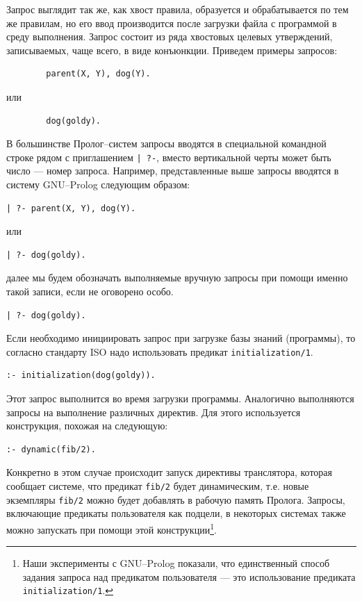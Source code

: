 \documentclass[12pt, openany, twoside]{book} %
\begin{document}
Запрос выглядит так же, как хвост правила, образуется и обрабатывается по тем же правилам, но его ввод производится после загрузки файла с программой в среду выполнения. Запрос состоит из ряда хвостовых целевых утверждений, записываемых, чаще всего, в виде конъюнкции. Приведем примеры запросов:
{\tt\begin{verbatim}
        parent(X, Y), dog(Y).
\end{verbatim}}
\noindent или
{\tt\begin{verbatim}
        dog(goldy).
\end{verbatim}}
В большинстве Пролог--систем запросы вводятся в специальной командной строке рядом с приглашением \texttt{| ?-}, вместо вертикальной черты может быть число --- номер запроса. Например, представленные выше запросы вводятся в систему GNU--Prolog следующим образом:
{\tt\begin{verbatim}
| ?- parent(X, Y), dog(Y).
\end{verbatim}}
\noindent или
{\tt\begin{verbatim}
| ?- dog(goldy).
\end{verbatim}}
далее мы будем обозначать выполняемые вручную запросы при помощи именно такой записи, если не оговорено особо.
{\tt\begin{verbatim}
| ?- dog(goldy).
\end{verbatim}}

Если необходимо инициировать запрос при загрузке базы знаний (программы), то согласно стандарту ISO надо использовать предикат \texttt{initialization/1}.
{\tt\begin{verbatim}
:- initialization(dog(goldy)).
\end{verbatim}}
Этот запрос выполнится во время загрузки программы. Аналогично выполняются запросы на выполнение различных директив. Для этого используется конструкция, похожая на следующую:
{\tt\begin{verbatim}
:- dynamic(fib/2).
\end{verbatim}}
Конкретно в этом случае происходит запуск директивы транслятора, которая сообщает системе, что предикат \texttt{fib/2} будет динамическим, т.е. новые экземпляры \texttt{fib/2} можно будет добавлять в рабочую память Пролога. Запросы, включающие предикаты пользователя как подцели, в некоторых системах также можно запускать при помощи этой конструкции\footnote{Наши эксперименты с GNU--Prolog показали, что единственный способ задания запроса над предикатом пользователя --- это использование предиката \texttt{initialization/1}.}.
\end{document}

